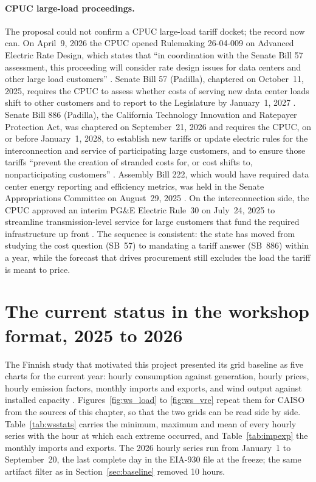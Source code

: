 \paragraph{CPUC large-load proceedings.} The proposal could not confirm a CPUC large-load tariff docket; the record now can. On April~9, 2026 the CPUC opened Rulemaking 26-04-009 on Advanced Electric Rate Design, which states that ``in coordination with the Senate Bill 57 assessment, this proceeding will consider rate design issues for data centers and other large load customers'' \citep[p.~1]{cpuc_oir2026}. Senate Bill 57 (Padilla), chaptered on October~11, 2025, requires the CPUC to assess whether costs of serving new data center loads shift to other customers and to report to the Legislature by January~1, 2027 \citep{sb57}. Senate Bill 886 (Padilla), the California Technology Innovation and Ratepayer Protection Act, was chaptered on September~21, 2026 and requires the CPUC, on or before January~1, 2028, to establish new tariffs or update electric rules for the interconnection and service of participating large customers, and to ensure those tariffs ``prevent the creation of stranded costs for, or cost shifts to, nonparticipating customers'' \citep{sb886,kqed2026}. Assembly Bill 222, which would have required data center energy reporting and efficiency metrics, was held in the Senate Appropriations Committee on August~29, 2025 \citep{ab222}. On the interconnection side, the CPUC approved an interim PG\&E Electric Rule~30 on July~24, 2025 to streamline transmission-level service for large customers that fund the required infrastructure up front \citep{cpuc_rule30}. The sequence is consistent: the state has moved from studying the cost question (SB~57) to mandating a tariff answer (SB~886) within a year, while the forecast that drives procurement still excludes the load the tariff is meant to price.

\section{The current status in the workshop format, 2025 to 2026}
\label{sec:workshop}

The Finnish study that motivated this project presented its grid baseline as five charts for the current year: hourly consumption against generation, hourly prices, hourly emission factors, monthly imports and exports, and wind output against installed capacity \citep{manner2026}. Figures~\ref{fig:ws_load} to \ref{fig:ws_vre} repeat them for CAISO from the sources of this chapter, so that the two grids can be read side by side. Table~\ref{tab:wsstats} carries the minimum, maximum and mean of every hourly series with the hour at which each extreme occurred, and Table~\ref{tab:impexp} the monthly imports and exports. The 2026 hourly series run from January~1 to September~20, the last complete day in the EIA-930 file at the freeze; the same artifact filter as in Section~\ref{sec:baseline} removed 10 hours.

